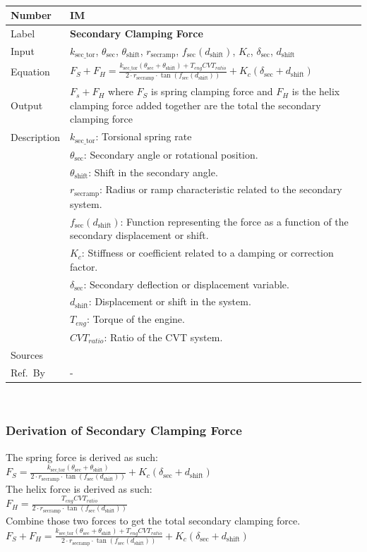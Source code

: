 \documentclass[12pt]{article}
\newcommand{\colAwidth}{0.13\textwidth}
\newcommand{\colBwidth}{0.82\textwidth}
\newcounter{instnum} %
\newcommand{\definstance}[7] {
~\newline
\noindent
\begin{minipage}{\textwidth}
\renewcommand*{\arraystretch}{1.5}
\begin{tabular}{| p{\colAwidth} | p{\colBwidth}|}
  \hline
  \rowcolor[gray]{0.9}
  Number& IM\refstepcounter{instnum}\theinstnum \label{inst:\theinstnum}\\
  \hline
  Label& \bf #1 \\
  \hline
  Input& #2\\
  \hline
  Equation& #3\\
  \hline
  Output& #4\\
  \hline
  Description& #5 \\
  \hline
  Sources& #6 \\
  \hline
  Ref.\ By & #7\\
  \hline
\end{tabular}
\end{minipage}\\
}
\begin{document}
\definstance
{Secondary Clamping Force}
{$k_{\text{sec\_tor}}$, $\theta_{\text{sec}}$, $\theta_{\text{shift}}$, $r_{\text{secramp}}$, $f_{\text{sec}}(d_{\text{shift}})$, $K_c$, $\delta_{\text{sec}}$, $d_{\text{shift}}$} %
{$F_S + F_H = \frac{k_{\text{sec\_tor}} (\theta_{\text{sec}} + \theta_{\text{shift}}) + T_{eng} CVT_{ratio}}{2 \cdot r_{\text{secramp}} \cdot \tan(f_{\text{sec}}(d_{\text{shift}}))} + K_c (\delta_{\text{sec}} + d_{\text{shift}})$} %
{$F_s + F_H$ where $F_S$ is spring clamping force and $F_H$ is the helix clamping force added together are the total the secondary clamping force } %
{$k_{\text{sec\_tor}}$: Torsional spring rate \\
  &$\theta_{\text{sec}}$: Secondary angle or rotational position. \\
  &$\theta_{\text{shift}}$: Shift in the secondary angle. \\
  &$r_{\text{secramp}}$: Radius or ramp characteristic related to the secondary system. \\
  &$f_{\text{sec}}(d_{\text{shift}})$: Function representing the force as a function of the secondary displacement or shift. \\
  &$K_c$: Stiffness or coefficient related to a damping or correction factor. \\
  &$\delta_{\text{sec}}$: Secondary deflection or displacement variable. \\
  &$d_{\text{shift}}$: Displacement or shift in the system.\\
  &$T_{eng}$: Torque of the engine. \\
  &$CVT_{ratio}$: Ratio of the CVT system.
} %
{} %
{-}

\subsubsection*{Derivation of Secondary Clamping Force}
The spring force is derived as such: \\
$F_S = \frac{k_{\text{sec\_tor}} (\theta_{\text{sec}} + \theta_{\text{shift}})}{2 \cdot r_{\text{secramp}} \cdot \tan(f_{\text{sec}}(d_{\text{shift}}))} + K_c (\delta_{\text{sec}} + d_{\text{shift}})$\\
{\newline}
The helix force is derived as such: \\
$F_H = \frac{T_{eng} CVT_{ratio}}{2 \cdot r_{\text{secramp}} \cdot \tan(f_{\text{sec}}(d_{\text{shift}}))}$\\
{\newline}
Combine those two forces to get the total secondary clamping force.\\
$F_S + F_H = \frac{k_{\text{sec\_tor}} (\theta_{\text{sec}} + \theta_{\text{shift}}) + T_{eng} CVT_{ratio}}{2 \cdot r_{\text{secramp}} \cdot \tan(f_{\text{sec}}(d_{\text{shift}}))} + K_c (\delta_{\text{sec}} + d_{\text{shift}})$
\end{document}
